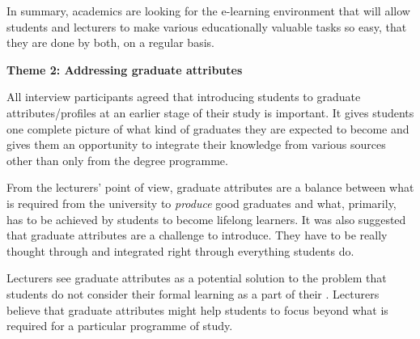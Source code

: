 
In summary, academics are looking for the e-learning environment that will allow
students and lecturers to make various educationally valuable tasks so easy,
that they are done by both, on a regular basis.

\textbf{Theme 2: Addressing graduate attributes}

All interview participants agreed that introducing students to graduate
attributes/profiles at an earlier stage of their study is important. It gives
students one complete picture of what kind of graduates they are expected to
become and gives them an opportunity to integrate their knowledge from various
sources other than only from the degree programme.


From the lecturers' point of view, graduate attributes are a balance between
what is required from the university to \textit{produce} good graduates and
what, primarily, has to be achieved by students to become lifelong learners. It
was also suggested that graduate attributes are a challenge to introduce. They
have to be really thought through and integrated right through everything
students do.


Lecturers see graduate attributes as a potential solution to the problem that
students do not consider their formal learning as a part of their \LLLsn.
Lecturers believe that graduate attributes might help students to focus beyond
what is required for a particular programme of study.

